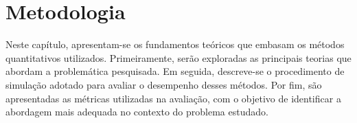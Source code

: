 \chapter{Metodologia}\label{metodo}



Neste capítulo, apresentam-se os fundamentos teóricos que embasam os métodos quantitativos utilizados. Primeiramente, serão exploradas as principais teorias que abordam a problemática pesquisada. Em seguida, descreve-se o procedimento de simulação adotado para avaliar o desempenho desses métodos. Por fim, são apresentadas as métricas utilizadas na avaliação, com o objetivo de identificar a abordagem mais adequada no contexto do problema estudado.




